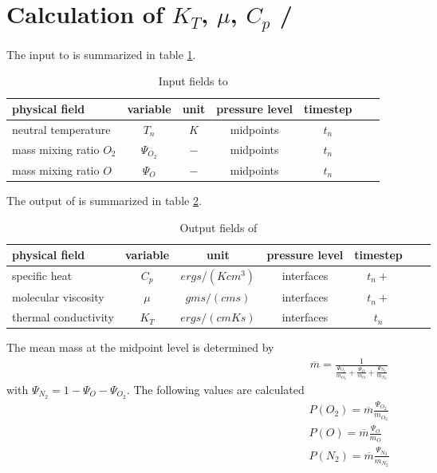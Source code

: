 %
\section{Calculation of $K_T$, $\mu$, $C_p$ /
}\label{cap:cpktkm}
%
The input to  is summarized in table
\ref{tab:input_cpktkm}.
%
\begin{table}[tb]
\begin{tabular}{|p{3.5cm} ||c|c|c|c|c|c|} \hline
physical field               & variable        & unit&pressure
level& timestep
\\ \hline \hline
%
neutral temperature &       $T_n$              & $K$   &  midpoints & $t_n$\\
mass mixing ratio $O_2$&       {$\Psi_{O_2}$}     & $-$   & midpoints  & $t_n$\\
mass mixing ratio $O$&       {$\Psi_{O}$}     & $-$   &  midpoints &
$t_n$
 \\ \hline
\end{tabular}
\caption{Input fields to }
\label{tab:input_cpktkm}
\end{table}
%
The output of  is summarized in table
\ref{tab:output_cpktkm}.
%
\begin{table}[tb]
\begin{tabular}{|p{3.5cm} ||c|c|c|c|c|c|} \hline
physical field               & variable        & unit&pressure
level& timestep \\ \hline \hline
specific heat    & $C_p$   & $ergs/(K cm^3)$   & interfaces  & $t_n+$ \\
molecular viscosity    & $\mu$   & $gms/(cm s)$   & interfaces  & $t_n+$ \\
thermal conductivity    & $K_T$   & $ergs/(cm K s)$   & interfaces & $t_n$
\\ \hline \hline
\end{tabular}
\caption{Output fields of }
\label{tab:output_cpktkm}
\end{table}
%
%
The mean mass at the midpoint level is determined by
%
\begin{align}
  \overline{m} = \frac{1}{\frac{\Psi_{O_2}}{m_{O_2}} +
       \frac{\Psi_{O}}{m_{O}} + \frac{\Psi_{N_2}}{m_{N_2}}}
\end{align}
%
with $\Psi_{N_2} = 1 - \Psi_{O} - \Psi_{O_2}$. The following values
are calculated
%
\begin{align}
  P(O_2) = \overline{m} \frac{\Psi_{O_2}}{m_{O_2}} \\
  P(O) = \overline{m} \frac{\Psi_{O}}{m_{O}} \\
  P(N_2) = \overline{m} \frac{\Psi_{N_2}}{m_{N_2}}
\end{align}

